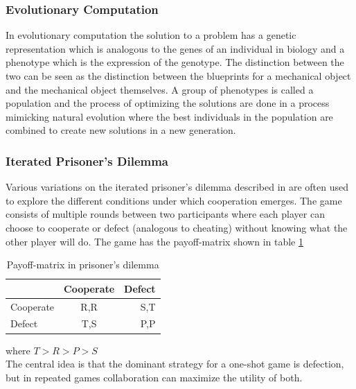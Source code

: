 \documentclass[a4paper]{book}
\begin{document}
\subsubsection{Evolutionary Computation} In evolutionary computation the solution to a problem has a genetic representation which is analogous to the genes of an individual in biology and a phenotype which is the expression of the genotype. The distinction between the two can be seen as the distinction between the blueprints for a mechanical object and the mechanical object themselves. A group of phenotypes is called a population and the process of optimizing the solutions are done in a process mimicking natural evolution where the best individuals in the population are combined to create new solutions in a new generation. 
\subsubsection{Iterated Prisoner's Dilemma}
Various variations on the iterated prisoner's dilemma described in \cite{axelrod_evolution_1981} are often used to explore the different conditions under which cooperation emerges. The game consists of multiple rounds between two participants where each player can choose to cooperate or defect (analogous to cheating) without knowing what the other player will do. The game has the  payoff-matrix shown in table \ref{table:payoff}

\begin{table}[htdp]
\begin{center}
\begin{tabular}{|l|c|r|}
	\hline
			& Cooperate 	& Defect \\ \hline
	Cooperate	& R,R		& S,T	 \\ \hline
	Defect		& T,S	 	& P,P \\\hline\hline
	\end{tabular}
\end{center}
\label{table:payoff}
\caption{Payoff-matrix in prisoner's dilemma}
\end{table}
where $ T > R > P > S$ \\

The central idea is that the dominant strategy for a one-shot game is defection, but in repeated games collaboration can maximize the utility of both.
\end{document}
